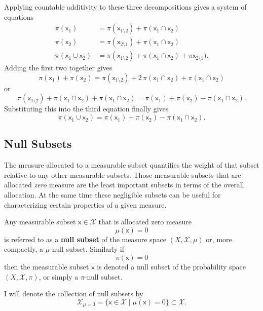 \documentclass[
  letterpaper,
  DIV=11,
  numbers=noendperiod]{scrartcl}
\begin{document}
Applying countable additivity to these three decompositions gives a
system of equations \begin{align*}
\pi(\mathsf{x}_{1}) &=
\pi(\mathsf{x}_{1 \setminus 2}) + \pi(\mathsf{x}_{1} \cap \mathsf{x}_{2})
\\
\pi(\mathsf{x}_{2}) &=
\pi(\mathsf{x}_{2 \setminus 1}) + \pi(\mathsf{x}_{1} \cap \mathsf{x}_{2})
\\
\pi(\mathsf{x}_{1} \cup \mathsf{x}_{2}) &=
\pi(\mathsf{x}_{1 \setminus 2})
+ \pi(\mathsf{x}_{1} \cap \mathsf{x}_{2})
+ \pi \mathsf{x}_{2 \setminus 1}).
\end{align*} Adding the first two together gives \[
\pi(\mathsf{x}_{1}) + \pi(\mathsf{x}_{2})
=
\pi(\mathsf{x}_{1 \setminus 2})
+ 2 \, \pi(\mathsf{x}_{1} \cap \mathsf{x}_{2})
+ \pi(\mathsf{x}_{1} \cap \mathsf{x}_{2})
\] or \[
\pi(\mathsf{x}_{1 \setminus 2})
+ \pi(\mathsf{x}_{1} \cap \mathsf{x}_{2})
+ \pi(\mathsf{x}_{1} \cap \mathsf{x}_{2})
=
\pi(\mathsf{x}_{1}) + \pi(\mathsf{x}_{2})
- \pi(\mathsf{x}_{1} \cap \mathsf{x}_{2}).
\] Substituting this into the third equation finally gives \[
\pi(\mathsf{x}_{1} \cup \mathsf{x}_{2})
=
\pi(\mathsf{x}_{1}) + \pi(\mathsf{x}_{2})
- \pi(\mathsf{x}_{1} \cap \mathsf{x}_{2}).
\]

\hypertarget{null-subsets}{%
\subsection{Null Subsets}\label{null-subsets}}

The measure allocated to a measurable subset quantifies the weight of
that subset relative to any other measurable subsets. Those measurable
subsets that are allocated \emph{zero} measure are the least important
subsets in terms of the overall allocation. At the same time these
negligible subsets can be useful for characterizing certain properties
of a given measure.

Any measurable subset \(\mathsf{x} \in \mathcal{X}\) that is allocated
zero measure \[
\mu(\mathsf{x}) = 0
\] is referred to as a \textbf{null subset} of the measure space
\((X, \mathcal{X}, \mu)\) or, more compactly, a \(\mu\)-null subset.
Similarly if \[
\pi(\mathsf{x}) = 0
\] then the measurable subset \(\mathsf{x}\) is denoted a null subset of
the probability space \((X, \mathcal{X}, \pi)\), or simply a
\(\pi\)-null subset.

I will denote the collection of null subsets by \[
\mathcal{X}_{\mu = 0}
= \{ \mathsf{x} \in \mathcal{X} \mid \mu(\mathsf{x}) = 0 \}
\subset \mathcal{X}.
\]
\end{document}
